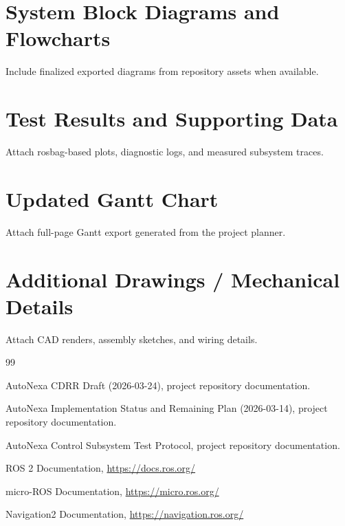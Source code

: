 \documentclass[12pt,a4paper]{report}
\begin{document}
\begin{appendices}

\chapter{System Block Diagrams and Flowcharts}
Include finalized exported diagrams from repository assets when available.

\chapter{Test Results and Supporting Data}
Attach rosbag-based plots, diagnostic logs, and measured subsystem traces.

\chapter{Updated Gantt Chart}
Attach full-page Gantt export generated from the project planner.

\chapter{Additional Drawings / Mechanical Details}
Attach CAD renders, assembly sketches, and wiring details.

\end{appendices}

\begin{thebibliography}{99}

AutoNexa CDRR Draft (2026-03-24), project repository documentation.

AutoNexa Implementation Status and Remaining Plan (2026-03-14), project repository documentation.

AutoNexa Control Subsystem Test Protocol, project repository documentation.

ROS 2 Documentation, \url{https://docs.ros.org/}

micro-ROS Documentation, \url{https://micro.ros.org/}

Navigation2 Documentation, \url{https://navigation.ros.org/}

\end{thebibliography}
\end{document}
